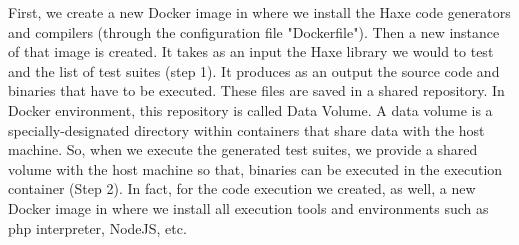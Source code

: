 \begin{table}[h]
	\centering
	
\caption{Memory stats}
\label{my-label}
\end{table}
First, we create a new Docker image in where we install the Haxe code generators and compilers (through the configuration file "Dockerfile"). Then a new instance of that image is created. It takes as an input the Haxe library we would to test and the list of test suites (step 1). It produces as an output the source code and binaries that have to be executed. These files are saved in a shared repository.
In Docker environment, this repository is called Data Volume. A data volume is a specially-designated directory within containers that share data with the host machine. So, when
we execute the generated test suites, we provide a shared volume with
the host machine so that, binaries can be executed in the execution container (Step 2). In fact, for the code execution we created, as well, a new Docker image in where we install all execution tools and environments such as php interpreter, NodeJS, etc. 

